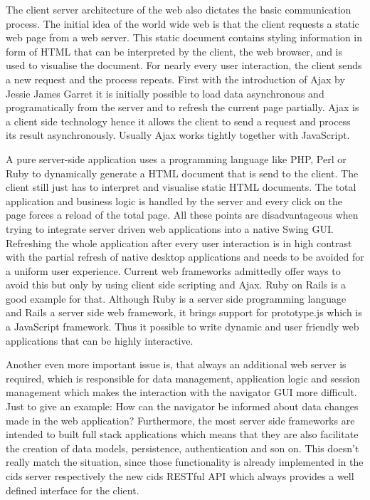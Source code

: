 The client server architecture of the web also dictates the basic communication process.
The initial idea of the world wide web is that the client requests a static web page from a web server.
This static document contains styling information in form of HTML that can be interpreted by the client, the web browser, and is used to visualise the document.
For nearly every user interaction, the client sends a new request and the process repeats.
First with the introduction of Ajax by Jessie James Garret \autocite[]{ajax} it is initially possible to load data asynchronous and programatically from the server and to refresh the current page partially.
Ajax is a client side technology hence it allows the client to send a request and process its result asynchronously.
Usually Ajax works tightly together with JavaScript.

A pure server-side application uses a programming language like PHP, Perl or Ruby to dynamically generate a HTML document that is send to the client.
The client still just has to interpret and visualise static HTML documents.
The total application and business logic is handled by the server and every click on the page forces a reload of the total page.
All these points are disadvantageous when trying to integrate server driven web applications into a native Swing GUI.
Refreshing the whole application after every user interaction is in high contrast with the partial refresh of native desktop applications and needs to be avoided for a uniform user experience.
Current web frameworks admittedly offer ways to avoid this but only by using client side scripting and Ajax.
Ruby on Rails is a good example for that.
Although Ruby is a server side programming language and Rails a server side web framework, it brings support for prototype.js which is a JavaScript framework. Thus it possible to write dynamic and user friendly web applications that can be highly interactive.

Another even more important issue is, that always an additional web server is required, which is responsible for data management, application logic and session management which makes the interaction with the navigator GUI more difficult.
Just to give an example: How can the navigator be informed about data changes made in the web application? Furthermore, the most server side frameworks are intended to built full stack applications which means that they are also facilitate the creation of data models, persistence, authentication and son on.
This doesn't really match the situation, since those functionality is already implemented in the cids server respectively the new cids RESTful API which always provides a well defined interface for the client.

